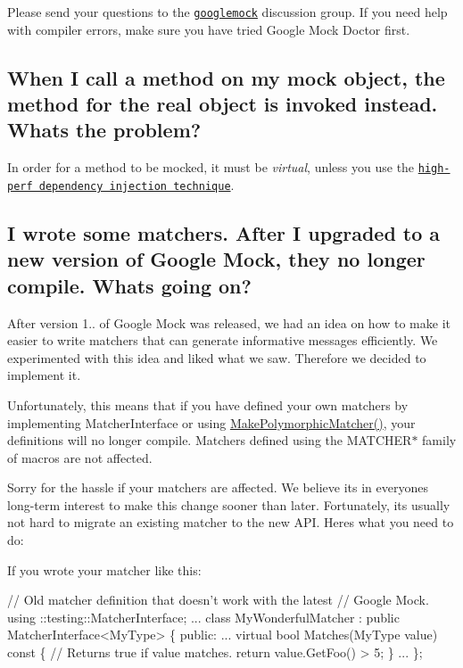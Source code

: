 Please send your questions to the \href{http://groups.google.com/group/googlemock}{\tt googlemock} discussion group. If you need help with compiler errors, make sure you have tried Google Mock Doctor first.

\subsection*{When I call a method on my mock object, the method for the real object is invoked instead. What\textquotesingle{}s the problem?}

In order for a method to be mocked, it must be {\itshape virtual}, unless you use the \href{http://code.google.com/p/googlemock/wiki/V1_7_CookBook#Mocking_Nonvirtual_Methods}{\tt high-\/perf dependency injection technique}.

\subsection*{I wrote some matchers. After I upgraded to a new version of Google Mock, they no longer compile. What\textquotesingle{}s going on?}

After version 1.. of Google Mock was released, we had an idea on how to make it easier to write matchers that can generate informative messages efficiently. We experimented with this idea and liked what we saw. Therefore we decided to implement it.

Unfortunately, this means that if you have defined your own matchers by implementing {\ttfamily Matcher\+Interface} or using {\ttfamily \hyperlink{namespacetesting_a667ca94f190ec2e17ee2fbfdb7d3da04}{Make\+Polymorphic\+Matcher()}}, your definitions will no longer compile. Matchers defined using the {\ttfamily M\+A\+T\+C\+H\+E\+R$\ast$} family of macros are not affected.

Sorry for the hassle if your matchers are affected. We believe it\textquotesingle{}s in everyone\textquotesingle{}s long-\/term interest to make this change sooner than later. Fortunately, it\textquotesingle{}s usually not hard to migrate an existing matcher to the new A\+PI. Here\textquotesingle{}s what you need to do\+:

If you wrote your matcher like this\+: 
\begin{DoxyCode}
// Old matcher definition that doesn't work with the latest
// Google Mock.
using ::testing::MatcherInterface;
...
class MyWonderfulMatcher : public MatcherInterface<MyType> \{
 public:
  ...
  virtual bool Matches(MyType value) const \{
    // Returns true if value matches.
    return value.GetFoo() > 5;
  \}
  ...
\};
\end{DoxyCode}


